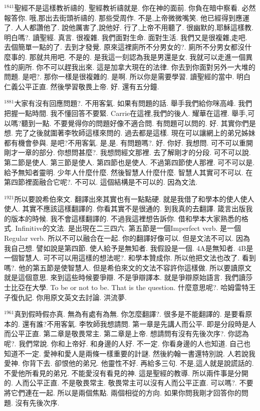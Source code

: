 \documentclass{book}
\begin{document}
$^{1841}$聖經不是這樣教祈禱的.
聖經教祈禱就是.
你在神的面前.
你負在暗中察看.
必然報答你.
哦,那出去街頭祈禱的.
那些受周作.
不是,上帝微微嘴笑.
他已經得到應運了.
人人都讚他了.
說他厲害了,說他好.
行了,上帝不用聽了.
很幽默的,耶穌這樣教.
明白嗎?.
讀聖經.
真言.
很複雜.
我們面對生命.
面對生活.
我們又是很複雜,走吧.
去個簡單一點的了.
去到才發覺.
原來這裡廁所不分男女的?.
廁所不分男女都沒什麼事的.
那就共用吧.
不是的.
是我這一刻認為我是男還是女.
我就可以走進一個異性的廁所.
你不可以趕我出來.
這是加拿大現在的法律.
你去到你面對另外一大堆的問題.
是吧?.
那你一樣是很複雜的.
是啊.
所以你是需要學習.
讀聖經的當中.
明白仁義公平正直.
然後學習敬畏上帝.
好.
還有五分鐘.

$^{1881}$大家有沒有回應問題?.
不用客氣.
如果有問題的話.
舉手我們給你咪高峰.
我們把握一點時間.
我不懂回答不要緊.
Carrie在這裡,我們的後人.
耀華在這裡.
舉手,可以嗎?聽到一點.
不要覺得你的問題好像不適合問.
有問題可以問的.
好.
其實你們是想.
完了之後就圍著李牧師這樣來問的.
過去都是這樣.
現在可以讓網上的弟兄姊妹都有機會參與.
是吧?不用客氣.
是,是.
有問題嗎?.
好.
你好.
我想問.
可不可以重開剛才一章的部分.
你想問甚麼?.
我想問經文那裡.
去了解剛才的分段.
可不可以說.
第二節是使人.
第三節是使人.
第四節也是使人.
不過第四節使人那裡.
可不可以是.
給予無知者靈明.
少年人什麼什麼.
然後智慧人什麼什麼.
智慧人其實可不可以.
在第四節裡面融合它呢?.
不可以.
這個結構是不可以的.
因為文法.

$^{1921}$所以要說希伯來文.
翻譯出來其實也有一點點硬.
就是我借了和學本的使人使人使人.
其實不應該這樣翻譯的.
你看其實不是很通的.
到我真的去翻譯.
箴言出版我的版本的時候.
我不會這樣翻譯的.
不過我這裡想告訴你.
借和學本大家熟悉的格式.
Infinitive的文法.
是出現在二三四六.
第五節是一個Imperfect verb.
是一個Regular verb.
所以不可以融合在一起.
你的翻譯好像可以.
但是文法不可以.
因為我自己想.
譬如說是第四節.
使人給予是無知者.
我假設是一個.
4A是無知者.
4B是一個智慧人.
可不可以用這樣的想法呢?.
和學本贊成你.
所以他把文法也改了.
看到嗎?.
他的第五節是使智慧人.
但是希伯來文的文法不容許你這樣做.
所以要讀原文就是這個意思.
來到這些時候要爭辯.
不是爭辯譯本.
就是爭辯原始語言.
我們讀莎士比亞在大學.
To be or not to be.
That is the question.
什麼意思呢?.
哈姆雷特王子復仇記.
你用原文英文去討論.
洪流夢.

$^{1961}$真到假時假亦真.
無為有處有為無.
你怎麼翻譯?.
很多是不能翻譯的.
是要看原本的.
還有誰?不用客氣.
李牧師我想請問.
第一章是先講人而公平.
即是分段時是人而公平正直.
第二章是敬畏常主.
第二章是上帝.
想請問有沒有先後次序?.
你認為呢?.
我們常說.
你和上帝好.
和身邊的人好.
不一定.
你看身邊的人也知道.
自己也知道不一定.
愛神和愛人是兩條一樣重要的計謎.
然後約翰一書還特別說.
人若說我愛神.
你背下去.
卻恨他的弟兄.
他靈性不好.
再給多三句.
不是,這人就是說謊話的.
不愛他所看見的弟兄.
不能愛沒有看見的神.
這是聖經的教導.
所以兩件事是分開的.
人而公平正直.
不是敬畏常主.
敬畏常主可以沒有人而公平正直.
可以嗎?.
不要將它們連在一起.
所以是兩個焦點.
兩個相從的方向.
如果你問我剛才回答你的問題.
沒有先後次序.
\end{document}

